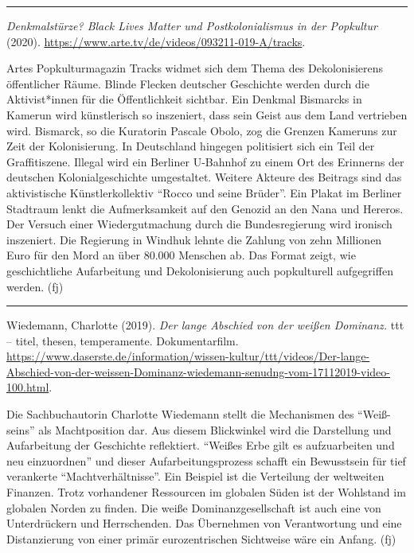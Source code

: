 \documentclass[a4paper,
fontsize=11pt,
oneside,
numbers=noperiodatend,
parskip=half-,
bibliography=totoc,
final
]{scrartcl}
\begin{document}
\begin{center}\rule{0.5\linewidth}{0.5pt}\end{center}

\emph{Denkmalstürze? Black Lives Matter und Postkolonialismus in der
Popkultur} (2020).
\url{https://www.arte.tv/de/videos/093211-019-A/tracks}.

Artes Popkulturmagazin Tracks widmet sich dem Thema des Dekolonisierens
öffentlicher Räume. Blinde Flecken deutscher Geschichte werden durch die
Aktivist*innen für die Öffentlichkeit sichtbar. Ein Denkmal Bismarcks in
Kamerun wird künstlerisch so inszeniert, dass sein Geist aus dem Land
vertrieben wird. Bismarck, so die Kuratorin Pascale Obolo, zog die
Grenzen Kameruns zur Zeit der Kolonisierung. In Deutschland hingegen
politisiert sich ein Teil der Graffitiszene. Illegal wird ein Berliner
U-Bahnhof zu einem Ort des Erinnerns der deutschen Kolonialgeschichte
umgestaltet. Weitere Akteure des Beitrags sind das aktivistische
Künstlerkollektiv \enquote{Rocco und seine Brüder}. Ein Plakat im
Berliner Stadtraum lenkt die Aufmerksamkeit auf den Genozid an den Nana
und Hereros. Der Versuch einer Wiedergutmachung durch die
Bundesregierung wird ironisch inszeniert. Die Regierung in Windhuk
lehnte die Zahlung von zehn Millionen Euro für den Mord an über 80.000
Menschen ab. Das Format zeigt, wie geschichtliche Aufarbeitung und
Dekolonisierung auch popkulturell aufgegriffen werden. (fj)

\begin{center}\rule{0.5\linewidth}{0.5pt}\end{center}

Wiedemann, Charlotte (2019). \emph{Der lange Abschied von der weißen
Dominanz.} ttt -- titel, thesen, temperamente. Dokumentarfilm.
\url{https://www.daserste.de/information/wissen-kultur/ttt/videos/Der-lange-Abschied-von-der-weissen-Dominanz-wiedemann-senudng-vom-17112019-video-100.html}.

Die Sachbuchautorin Charlotte Wiedemann stellt die Mechanismen des
\enquote{Weiß-seins} als Machtposition dar. Aus diesem Blickwinkel wird
die Darstellung und Aufarbeitung der Geschichte reflektiert.
\enquote{Weißes Erbe gilt es aufzuarbeiten und neu einzuordnen} und
dieser Aufarbeitungsprozess schafft ein Bewusstsein für tief verankerte
\enquote{Machtverhältnisse}. Ein Beispiel ist die Verteilung der
weltweiten Finanzen. Trotz vorhandener Ressourcen im globalen Süden ist
der Wohlstand im globalen Norden zu finden. Die weiße
Dominanzgesellschaft ist auch eine von Unterdrückern und Herrschenden.
Das Übernehmen von Verantwortung und eine Distanzierung von einer primär
eurozentrischen Sichtweise wäre ein Anfang. (fj)
\end{document}

